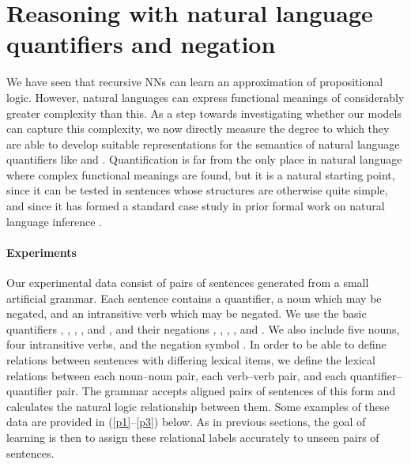 \section{Reasoning with natural language quantifiers and negation}\label{sec:quantifiers}

We have seen that recursive NNs can learn an approximation of propositional
logic.  However, natural languages can express functional meanings of
considerably greater complexity than this.  As a step towards
investigating whether our models can capture this complexity, we now
directly measure the degree to which they are able to
develop suitable representations for the semantics of natural language
quantifiers like  and . Quantification is far from
the only place in natural language where complex functional meanings
are found, but it is a natural starting point, since it can be tested
in sentences whose structures are otherwise quite simple, and since it
has formed a standard case study in prior formal work on natural
language inference \cite{Icard:Moss:2013:LILT}.

\paragraph{Experiments}
Our experimental data consist of pairs of sentences generated from a
small artificial grammar. Each sentence contains a quantifier, a noun
which may be negated, and an intransitive verb which may be
negated. We use the basic quantifiers , , ,
, and , and their negations , ,
, , and . We also
include five nouns, four intransitive verbs, and the negation symbol
. In order to be able to define relations between sentences
with differing lexical items, we define the lexical relations between
each noun--noun pair, each verb--verb pair, and each
quantifier--quantifier pair. The grammar accepts aligned pairs of
sentences of this form and calculates the natural logic relationship
between them.  Some examples of these data are provided in (\ref{p1}--\ref{p3}) below.
  As in previous sections, the goal of
learning is then to assign these relational labels accurately to
unseen pairs of sentences.



